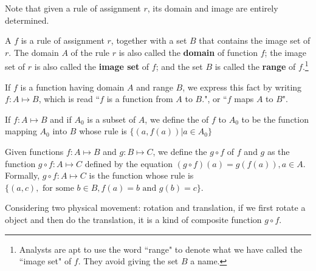 Note that given a rule of assignment $r$, its domain and image are entirely determined.

\begin{definition}[function]
A \textbf{} $f$ is a rule of assignment $r$, together with a set $B$ that contains the image set of $r$. The domain $A$ of the rule $r$ is also called the \textbf{domain} of function $f$; the image set of $r$ is also called the \textbf{image set} of $f$; and the set $B$ is called the \textbf{range} of $f$.\footnote{Analysts are apt to use the word ``range" to denote what we have called the ``image set" of $f$. They avoid giving the set $B$ a name.}

If $f$ is a function having domain $A$ and range $B$, we express this fact by writing $f: A \mapsto B$, which is read ``$f$ is a function from $A$ to $B$.", or ``$f$ maps $A$ to $B$".
\end{definition}

\begin{definition}[resitriction]
If $f: A \mapsto B$ and if $A_0$ is a subset of $A$, we define the \textbf{} of $f$ to $A_0$ to be the function mapping $A_0$ into $B$ whose rule is $\{(a, f(a)) | a \in A_0\}$
\end{definition}

\begin{definition}[composite]
Given functions $f:A \mapsto B$ and $g: B \mapsto C$, we define the \textbf{} $g \circ f$ of $f$ and $g$ as the function $g \circ f: A \mapsto C$ defined by the equation $(g \circ f)(a) = g(f(a)), a \in A$. Formally, $g \circ f: A \mapsto C$ is the function whose rule is $\{(a, c), \text{ for some } b\in B, f(a) = b \text{ and } g(b) = c\}$.
\end{definition}

Considering two physical movement: rotation and translation, if we first rotate a object and then do the translation, it is a kind of composite function $g \circ f$.

